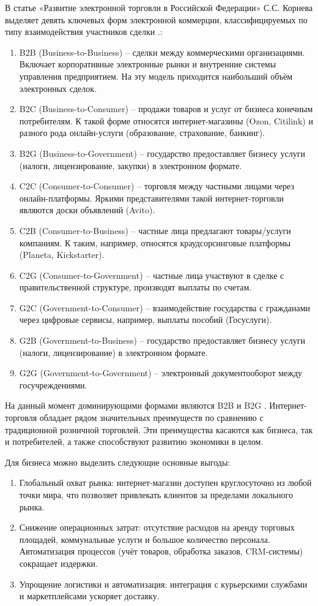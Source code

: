 В статье «Развитие электронной торговли в Российской Федерации» С.С. Корнева выделяет девять ключевых форм электронной коммерции, классифицируемых по типу взаимодействия участников сделки \cite{2}.:
\begin{enumerate}
	\item B2B (Business-to-Business) – сделки между коммерческими организациями. Включает корпоративные электронные рынки и внутренние системы управления предприятием. На эту модель приходится наибольший объём электронных сделок.
	\item B2C (Business-to-Consumer) – продажи товаров и услуг от бизнеса конечным потребителям. К такой форме относятся интернет-магазины (Ozon, Citilink) и разного рода онлайн-услуги (образование, страхование, банкинг).
	\item B2G (Business-to-Government) – государство предоставляет бизнесу услуги (налоги, лицензирование, закупки) в электронном формате.
	\item C2C (Consumer-to-Consumer) – торговля между частными лицами через онлайн-платформы. Яркими представителями такой интернет-торговли являются доски объявлений (Avito).
	\item C2B (Consumer-to-Business) – частные лица предлагают товары/услуги компаниям. К таким, например, относятся краудсорсинговые платформы (Planeta, Kickstarter).
	\item C2G (Consumer-to-Government) – частные лица участвуют в сделке с правительственной структуре, производят выплаты по счетам.
	\item G2C (Government-to-Consumer) – взаимодействие государства с гражданами через цифровые сервисы, например, выплаты пособий (Госуслуги).
	\item G2B (Government-to-Business) – государство предоставляет бизнесу услуги (налоги, лицензирование) в электронном формате.
	\item G2G (Government-to-Government) – электронный документооборот между госучреждениями.
 \end{enumerate}
 
На данный момент доминирующими формами являются B2B и B2G \cite{2}.
Интернет-торговля обладает рядом значительных преимуществ по сравнению с традиционной розничной торговлей. Эти преимущества касаются как бизнеса, так и потребителей, а также способствуют развитию экономики в целом.

Для бизнеса можно выделить следующие основные выгоды:
 \begin{enumerate}
 	\item Глобальный охват рынка: интернет-магазин доступен круглосуточно из любой точки мира, что позволяет привлекать клиентов за пределами локального рынка.
 	\item Снижение операционных затрат: отсутствие расходов на аренду торговых площадей, коммунальные услуги и большое количество персонала. Автоматизация процессов (учёт товаров, обработка заказов, CRM-системы) сокращает издержки.
 	\item Упрощение логистики и автоматизация: интеграция с курьерскими службами и маркетплейсами ускоряет доставку.
 \end{enumerate}
 

